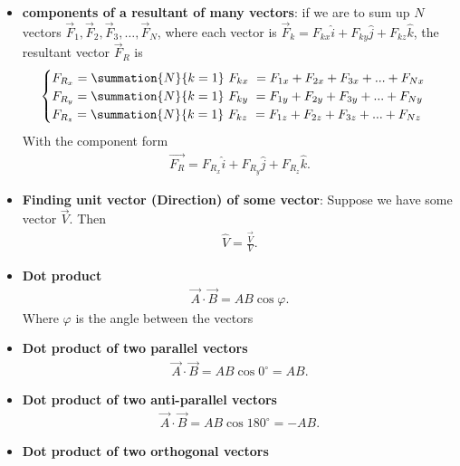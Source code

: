\documentclass{report}
\begin{document}
\begin{itemize}
    \item \textbf{components of a resultant of many vectors}: if we are to sum up $N$ vectors $\vec{F}_1, \vec{F}_2, \vec{F}_3, \ldots, \vec{F}_N$, where each vector is $\vec{F}_k = F_{kx}\hat{i} + F_{ky}\hat{j} + F_{kz}\hat{k}$, the resultant vector $\vec{F}_R$ is
           \begin{equation}
                \begin{cases}
                    F_{R_{x}} = \summation{N}{k=1}\ F_{kx}\ = F_{1x} + F_{2x} + F_{3x} + ... + F_{Nx} \\
                    F_{R_{y}} = \summation{N}{k=1}\ F_{ky}\ = F_{1y} + F_{2y} + F_{3y} + ... + F_{Ny} \\
                    F_{R_{z}} = \summation{N}{k=1}\ F_{kz}\ = F_{1z} + F_{2z} + F_{3z} + ... + F_{Nz} \\
                \end{cases}
            \end{equation}
        With the component form 
        \begin{align*}
            \vec{F_{R}} = F_{R_{x}}\hat{i} + F_{R_{y}}\hat{j} + F_{R_{z}}\hat{k}
        .\end{align*}
    \item \textbf{Finding unit vector (Direction) of some vector}: Suppose we have some vector $\vec{V}$. Then 
        \begin{align*}
            \hat{V} = \frac{\vec{V}}{V}
        .\end{align*}
    \item \textbf{Dot product}
        \begin{align*}
            \vec{A} \cdot \vec{B} = AB\cos{\varphi} 
        .\end{align*}
        Where $\varphi$ is the angle between the vectors
    \item \textbf{Dot product of two parallel vectors}
        \begin{align*}
            \vec{A} \cdot \vec{B} = AB\cos{0^{\circ}} = AB
        .\end{align*}
    \item \textbf{Dot product of two anti-parallel vectors}
        \begin{align*}
            \vec{A} \cdot \vec{B} = AB\cos{180^{\circ}} = -AB
        .\end{align*}
    \item \textbf{Dot product of two orthogonal vectors}
        \begin{align*}

\end{align*}
\end{itemize}
\end{document}
